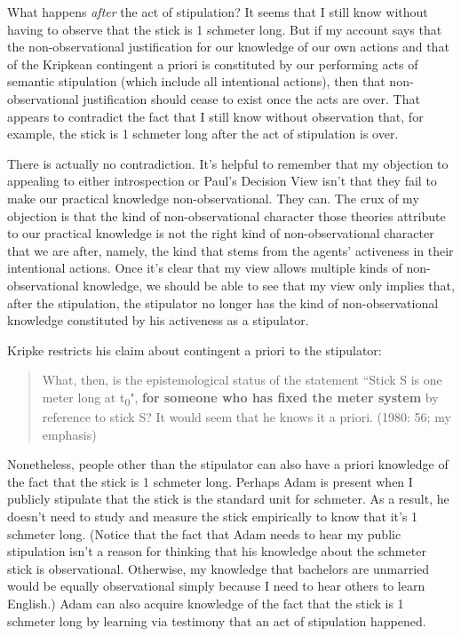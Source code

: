 \documentclass[a4paper,12pt]{article}
\begin{document}
What happens \emph{after} the act of stipulation? It seems that I still know without having to observe that the stick is 1 schmeter long. But if my account says that the non-observational justification for our knowledge of our own actions and that of the Kripkean contingent a priori is constituted by our performing acts of semantic stipulation (which include all intentional actions), then that non-observational justification should cease to exist once the acts are over. That appears to contradict the fact that I still know without observation that, for example, the stick is 1 schmeter long after the act of stipulation is over.

There is actually no contradiction. It's helpful to remember that my objection to appealing to either introspection or Paul's Decision View isn't that they fail to make our practical knowledge non-observational. They can. The crux of my objection is that the kind of non-observational character those theories attribute to our practical knowledge is not the right kind of non-observational character that we are after, namely, the kind that stems from the agents' activeness in their intentional actions. Once it's clear that my view allows multiple kinds of non-observational knowledge, we should be able to see that my view only implies that, after the stipulation, the stipulator no longer has the kind of non-observational knowledge constituted by his activeness as a stipulator.

Kripke restricts his claim about contingent a priori to the stipulator:

\begin{quote} What, then, is the epistemological status of the statement ``Stick S is one meter long at t\textsubscript{0}", \textbf{for someone who has fixed the meter system} by reference to stick S? It would seem that he knows it a priori. (1980: 56; my emphasis) \end{quote}

Nonetheless, people other than the stipulator can also have a priori knowledge of the fact that the stick is 1 schmeter long. Perhaps Adam is present when I publicly stipulate that the stick is the standard unit for schmeter. As a result, he doesn't need to study and measure the stick empirically to know that it's 1 schmeter long. (Notice that the fact that Adam needs to hear my public stipulation isn't a reason for thinking that his knowledge about the schmeter stick is observational. Otherwise, my knowledge that bachelors are unmarried would be equally observational simply because I need to hear others to learn English.) Adam can also acquire knowledge of the fact that the stick is 1 schmeter long by learning via testimony that an act of stipulation happened.
\end{document}
